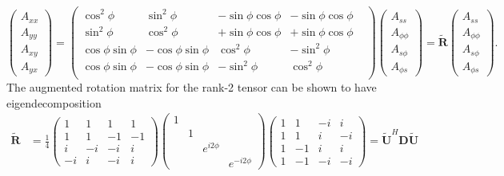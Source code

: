 \[\begin{pmatrix} A_{xx} \\ A_{yy} \\ A_{xy} \\ A_{yx} \end{pmatrix} = 
\begin{pmatrix}
    \cos^2\phi & \sin^2\phi & -\sin\phi\cos\phi & -\sin\phi\cos\phi \\
    \sin^2\phi & \cos^2\phi & +\sin\phi\cos\phi & +\sin\phi\cos\phi \\
    \cos\phi \sin\phi & -\cos\phi \sin\phi & \cos^2\phi & - \sin^2\phi & \\ 
    \cos\phi \sin\phi & -\cos\phi \sin\phi & - \sin^2\phi & \cos^2\phi \\ 
\end{pmatrix}
\begin{pmatrix} A_{ss} \\ A_{\phi\phi} \\ A_{s\phi} \\ A_{\phi s} \end{pmatrix} 
= \widetilde{\mathbf{R}} \begin{pmatrix} A_{ss} \\ A_{\phi\phi} \\ A_{s\phi} \\ A_{\phi s} \end{pmatrix}.
\]
The augmented rotation matrix for the rank-2 tensor can be shown to have eigendecomposition
\[\begin{aligned}
    \widetilde{\mathbf{R}} &= \frac{1}{4}
    \begin{pmatrix}
        1 & 1 & 1 & 1 \\
        1 & 1 & -1 & -1\\
        i & -i & -i & i \\
        -i & i & -i & i
    \end{pmatrix}
    \begin{pmatrix} 1 & & & \\ & 1 & & \\ & & e^{i2\phi} & \\ & & & e^{-i2\phi} \end{pmatrix}
    \begin{pmatrix}
        1 & 1 & -i & i\\
        1 & 1 & i & -i\\
        1 & -1 & i & i \\ 
        1 & -1 & -i & -i
    \end{pmatrix} = \widetilde{\mathbf{U}}^H \mathbf{D} \widetilde{\mathbf{U}}
\end{aligned}\]
